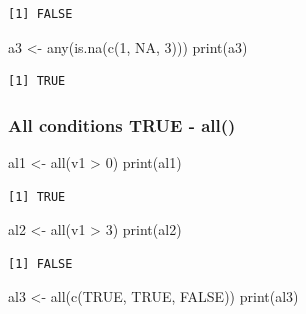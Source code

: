 \documentclass[
  letterpaper,
  DIV=11,
  numbers=noendperiod]{scrartcl}
\newenvironment{Shaded}{\begin{snugshade}}{\end{snugshade}}
\newcommand{\ConstantTok}[1]{\textcolor[rgb]{0.56,0.35,0.01}{#1}}
\newcommand{\DecValTok}[1]{\textcolor[rgb]{0.68,0.00,0.00}{#1}}
\newcommand{\FunctionTok}[1]{\textcolor[rgb]{0.28,0.35,0.67}{#1}}
\newcommand{\NormalTok}[1]{\textcolor[rgb]{0.00,0.23,0.31}{#1}}
\newcommand{\OtherTok}[1]{\textcolor[rgb]{0.00,0.23,0.31}{#1}}
\newcommand{\SpecialCharTok}[1]{\textcolor[rgb]{0.37,0.37,0.37}{#1}}
\begin{document}
\begin{verbatim}
[1] FALSE
\end{verbatim}

\begin{Shaded}
\begin{Highlighting}[]
\NormalTok{a3 }\OtherTok{\textless{}{-}} \FunctionTok{any}\NormalTok{(}\FunctionTok{is.na}\NormalTok{(}\FunctionTok{c}\NormalTok{(}\DecValTok{1}\NormalTok{, }\ConstantTok{NA}\NormalTok{, }\DecValTok{3}\NormalTok{)))}
\FunctionTok{print}\NormalTok{(a3)}
\end{Highlighting}
\end{Shaded}

\begin{verbatim}
[1] TRUE
\end{verbatim}

\subsubsection{All conditions TRUE -
all()}\label{all-conditions-true---all}

\begin{Shaded}
\begin{Highlighting}[]
\NormalTok{al1 }\OtherTok{\textless{}{-}} \FunctionTok{all}\NormalTok{(v1 }\SpecialCharTok{\textgreater{}} \DecValTok{0}\NormalTok{)}
\FunctionTok{print}\NormalTok{(al1)}
\end{Highlighting}
\end{Shaded}

\begin{verbatim}
[1] TRUE
\end{verbatim}

\begin{Shaded}
\begin{Highlighting}[]
\NormalTok{al2 }\OtherTok{\textless{}{-}} \FunctionTok{all}\NormalTok{(v1 }\SpecialCharTok{\textgreater{}} \DecValTok{3}\NormalTok{)}
\FunctionTok{print}\NormalTok{(al2)}
\end{Highlighting}
\end{Shaded}

\begin{verbatim}
[1] FALSE
\end{verbatim}

\begin{Shaded}
\begin{Highlighting}[]
\NormalTok{al3 }\OtherTok{\textless{}{-}} \FunctionTok{all}\NormalTok{(}\FunctionTok{c}\NormalTok{(}\ConstantTok{TRUE}\NormalTok{, }\ConstantTok{TRUE}\NormalTok{, }\ConstantTok{FALSE}\NormalTok{))}
\FunctionTok{print}\NormalTok{(al3)}
\end{Highlighting}
\end{Shaded}
\end{document}
